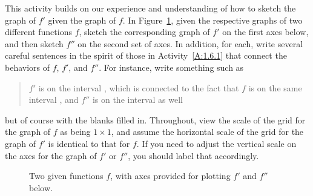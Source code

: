 \begin{activity} \label{A:1.6.2}
This activity builds on our experience and understanding of how to sketch the graph of $f'$ given the graph of $f$.  In Figure~\ref{F:1.6.A2}, given the respective graphs of two different functions $f$, sketch the corresponding graph of $f'$ on the first axes below, and then sketch $f''$ on the second set of axes.  In addition, for each, write several careful sentences in the spirit of those in Activity~\ref{A:1.6.1} that connect the behaviors of $f$, $f'$, and $f''$.  For instance, write something such as
\begin{quote}
$f'$ is \underline{\hspace{1.5in}} on the interval \underline{\hspace{0.5in}}, which is connected to the fact that $f$ is \underline{\hspace{1.5in}} on the same interval \underline{\hspace{0.5in}}, and $f''$ is \underline{\hspace{1.5in}} on the interval as well
\end{quote}
but of course with the blanks filled in.  Throughout, view the scale of the grid for the graph of $f$ as being $1 \times 1$, and assume the horizontal scale of the grid for the graph of $f'$ is identical to that for $f$.  If you need to adjust the vertical scale on the axes for the graph of $f'$ or $f''$, you should label that accordingly.
\begin{figure}[h]
\begin{center}
\caption{Two given functions $f$, with axes provided for plotting $f'$ and $f''$ below.} \label{F:1.6.A2}
\end{center}
\end{figure}
\end{activity}
